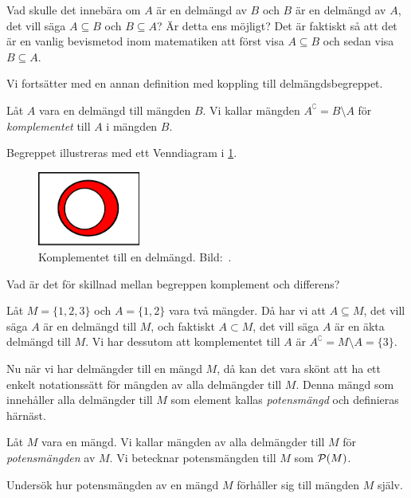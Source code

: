 \begin{exercise}
  Vad skulle det innebära om \(A\) är en delmängd av \(B\) och \(B\) är en
  delmängd av \(A\), det vill säga \(A\subseteq B\) och \(B\subseteq A\)?
  Är detta ens möjligt?
  Det är faktiskt så att det är en vanlig bevismetod inom matematiken att
  först visa \(A\subseteq B\) och sedan visa \(B\subseteq A\).
\end{exercise}

Vi fortsätter med en annan definition med koppling till delmängdsbegreppet.
\begin{definition}\label{def:Komplement}
  Låt \(A\) vara en delmängd till mängden \(B\).
  Vi kallar mängden \(A^\complement = B\setminus A\) för \emph{komplementet}
  till \(A\) i mängden \(B\).
\end{definition}
Begreppet illustreras med ett Venndiagram i \cref{fig:Komplement}.
\begin{figure}
  \includegraphics[width=0.3\textwidth]{figs/complement.pdf}
  \caption{%
    Komplementet till en delmängd.
    Bild:~\cite{Wikipedia2013Set}.
  }\label{fig:Komplement}
\end{figure}

\begin{exercise}
  Vad är det för skillnad mellan begreppen komplement och differens?
\end{exercise}

\begin{example}
  Låt \(M=\{1,2,3\}\) och \(A=\{1,2\}\) vara två mängder.
  Då har vi att \(A\subseteq M\), det vill säga \(A\) är en delmängd till
  \(M\), och faktiskt \(A\subset M\), det vill säga \(A\) är en äkta delmängd
  till \(M\).
  Vi har dessutom att komplementet till \(A\) är \(A^\complement =
  M\setminus A = \{3\}\).
\end{example}

Nu när vi har delmängder till en mängd \(M\), då kan det vara skönt att ha ett
enkelt notationssätt för mängden av alla delmängder till \(M\).
Denna mängd som innehåller alla delmängder till \(M\) som element kallas
\emph{potensmängd} och definieras härnäst.
\begin{definition}\label{def:Potensmangd}
  Låt \(M\) vara en mängd.
  Vi kallar mängden av alla delmängder till \(M\) för \emph{potensmängden}
  av \(M\).
  Vi betecknar potensmängden till \(M\) som \(\mathcal{P}(M)\).
\end{definition}
\begin{exercise}
  Undersök hur potensmängden av en mängd \(M\) förhåller sig till mängden
  \(M\) själv.
\end{exercise}


